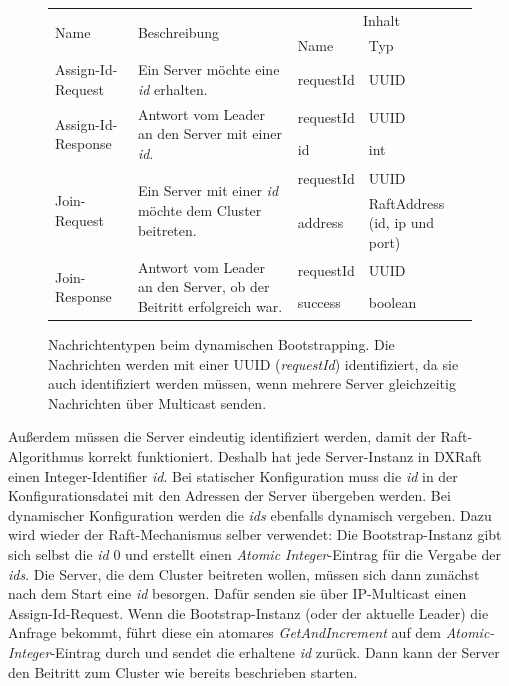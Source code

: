\begin{figure}[h]
	\footnotesize
	\begin{tabular}{ | l | l | l | l |}	
		\hline
		\multirow{2}{*}{Name} & \multirow{2}{*}{Beschreibung} & \multicolumn{2}{|c|}{Inhalt}  \\ \cline{3-4}
		& & Name & Typ \\ \hline
		Assign-Id-Request & Ein Server möchte eine \textit{id} erhalten. 
		& requestId & UUID \\ \hline
		\multirow{2}{*}{Assign-Id-Response} &  \multirow{2}{0.35\textwidth}{Antwort vom Leader an den Server mit einer \textit{id}.} 
		& requestId & UUID \\
		& & id & int \\ \hline
		\multirow{2}{*}{Join-Request} &  \multirow{2}{0.35\textwidth}{Ein Server mit einer \textit{id} möchte dem Cluster beitreten.} 
		& requestId & UUID \\
		& & address & RaftAddress (id, ip und port)\\ \hline
		\multirow{2}{*}{Join-Response} &  \multirow{2}{0.35\textwidth}{Antwort vom Leader an den Server, ob der Beitritt erfolgreich war.} & requestId & UUID\\
		& & success & boolean \\ \hline
	\end{tabular}
	\caption{Nachrichtentypen beim dynamischen Bootstrapping. Die Nachrichten werden mit einer UUID (\textit{requestId}) identifiziert, da sie auch identifiziert werden müssen, wenn mehrere Server gleichzeitig Nachrichten über Multicast senden.}
	\label{fig:bootstrap-messages}
\end{figure}

Außerdem müssen die Server eindeutig identifiziert werden, damit der Raft-Algorithmus korrekt funktioniert. Deshalb hat jede Server-Instanz in DXRaft einen Integer-Identifier \textit{id}. Bei statischer Konfiguration muss die \textit{id} in der Konfigurationsdatei mit den Adressen der Server übergeben werden. Bei dynamischer Konfiguration werden die \textit{ids} ebenfalls dynamisch vergeben. Dazu wird wieder der Raft-Mechanismus selber verwendet: Die Bootstrap-Instanz gibt sich selbst die \textit{id} 0 und erstellt einen \textit{Atomic Integer}-Eintrag für die Vergabe der \textit{ids}. Die Server, die dem Cluster beitreten wollen, müssen sich dann zunächst nach dem Start eine \textit{id} besorgen. Dafür senden sie über IP-Multicast einen Assign-Id-Request. Wenn die Bootstrap-Instanz (oder der aktuelle Leader) die Anfrage bekommt, führt diese ein atomares \textit{GetAndIncrement} auf dem \textit{Atomic-Integer}-Eintrag durch und sendet die erhaltene \textit{id} zurück. Dann kann der Server den Beitritt zum Cluster wie bereits beschrieben starten.

